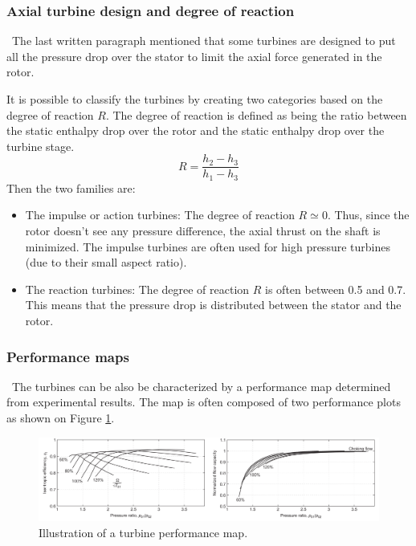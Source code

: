 \subsubsection{Axial turbine design and degree of reaction}
\quad\ The last written paragraph mentioned that some turbines are designed to put all the pressure drop over the stator to limit the axial force generated in the rotor.

It is possible to classify the turbines by creating two categories based on the degree of reaction \(R\). The degree of reaction is defined as being the ratio between the static enthalpy drop over the rotor and the static enthalpy drop over the turbine stage.
\begin{equation}
    R = \frac{h_2 - h_3}{h_1 - h_3}\label{eq:C3_R}
\end{equation}
Then the two families are:

\begin{itemize}
    \item The impulse or action turbines: The degree of reaction \(R\simeq 0\). Thus, since the rotor doesn't see any pressure difference, the axial thrust on the shaft is minimized. The impulse turbines are often used for high pressure turbines (due to their small aspect ratio).
    \item The reaction turbines: The degree of reaction \(R\) is often between 0.5 and 0.7. This means that the pressure drop is distributed between the stator and the rotor.
\end{itemize}

\subsubsection{Performance maps}
\quad\ The turbines can be also be characterized by a performance map determined from experimental results. The map is often composed of two performance plots as shown on Figure \ref{fig:C3_turbmap}.

\begin{figure}[h]
    \centering
    \includegraphics[width=\textwidth]{Turb_Map.png}
    \caption{Illustration of a turbine performance map.}
    \label{fig:C3_turbmap}
\end{figure}

